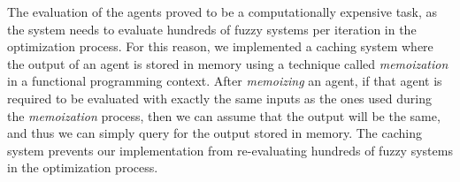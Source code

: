 ﻿\documentclass{ieeeaccess}
\begin{document}
The evaluation of the agents proved to be a computationally expensive
task, as the system needs to evaluate hundreds of fuzzy systems per
iteration in the optimization process. For this reason, we implemented
a caching system where the output of an agent is stored in memory
using a technique called \textit{memoization}
\cite{johnson1995memoization} in a functional programming
context. After \textit{memoizing} an agent, if that agent is required
to be evaluated with exactly the same inputs as the ones used during
the \textit{memoization} process, then we can assume that the output
will be the same, and thus we can simply query for the output stored
in memory. The caching system prevents our implementation from
re-evaluating hundreds of fuzzy systems in the optimization process.




\end{document}
